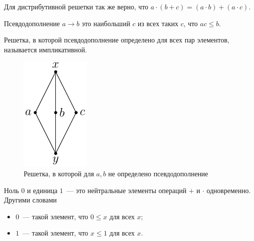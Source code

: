 \begin{lemma}
    Для дистрибутивной решетки так же верно, что $a \cdot (b + c) = (a \cdot b) + (a \cdot c)$.
\end{lemma}

\begin{definition}
    Псевдодополнение $a\to b$ это наибольший $c$ из всех таких $c$, что $ac \leqslant b$.

    Решетка, в которой псевдодополнение определено для всех пар элементов, называется импликативной.
\end{definition}

\begin{figure}
    \begin{center}
        \includegraphics{img/diamont.pdf}
        \caption{Решетка, в которой для $a,b$ не определено псевдодополнение}
    \end{center}
\end{figure}

\begin{definition}
Ноль $0$ и единица $1$~--- это нейтральные элементы операций $+$ и $\cdot$ одновременно.     
Другими словами 
\begin{itemize}
    \item $0$~--- такой элемент, что $0 \leqslant x $ для всех $x$;
    \item $1$~--- такой элемент, что $x \leqslant 1 $ для всех $x$.
\end{itemize}
\end{definition}


